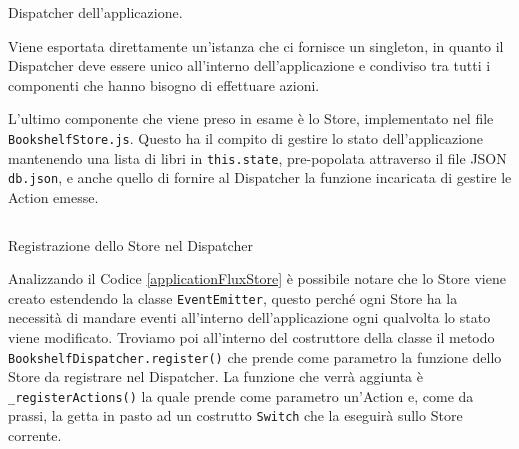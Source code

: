 \begin{listing}[ht]
\inputminted{jsx}{sources/applicationFluxDispatcher.js}
\caption{Dispatcher dell'applicazione.} 
\label{applicationFluxDispatcher} 
\end{listing} 

Viene esportata direttamente un'istanza che ci fornisce un singleton, in quanto il Dispatcher deve essere unico all'interno dell'applicazione e condiviso tra tutti i componenti che hanno bisogno di effettuare azioni.

L'ultimo componente che viene preso in esame è lo Store, implementato nel file \texttt{BookshelfStore.js}. Questo ha il compito di gestire lo stato dell'applicazione mantenendo una lista di libri in \texttt{this.state}, pre-popolata attraverso il file JSON \texttt{db.json}, e anche quello di fornire al Dispatcher la funzione incaricata di gestire le Action emesse.

\begin{listing}[ht]
\inputminted{jsx}{sources/applicationFluxStore.js}
\caption{Registrazione dello Store nel Dispatcher} 
\label{applicationFluxStore} 
\end{listing}

Analizzando il Codice \ref{applicationFluxStore} è possibile notare che lo Store viene creato estendendo la classe \texttt{EventEmitter}, questo perché ogni Store ha la necessità di mandare eventi all'interno dell'applicazione ogni qualvolta lo stato viene modificato. Troviamo poi all'interno del costruttore della classe il metodo \texttt{BookshelfDispatcher.register()} che prende come parametro la funzione dello Store da registrare nel Dispatcher. La funzione che verrà aggiunta è \texttt{_registerActions()} la quale prende come parametro un'Action e, come da prassi, la getta in pasto ad un costrutto \texttt{Switch} che la eseguirà sullo Store corrente.


